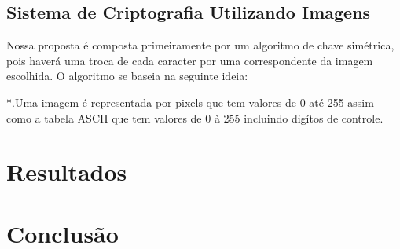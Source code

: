 \documentclass[12pt]{article}
\begin{document}
\subsection{Sistema de Criptografia Utilizando Imagens}
Nossa proposta é composta primeiramente por um algoritmo de chave simétrica, pois haverá uma troca de cada caracter por uma correspondente da imagem escolhida. O algoritmo se baseia na seguinte ideia:

*.Uma imagem é representada por pixels que tem valores de 0 até 255 assim como a tabela ASCII que tem valores de 0 à 255 incluindo digítos de controle.

\section{Resultados}\label{sec:resultados}
\section{Conclusão}\label{sec:conclusao}




\end{document}
